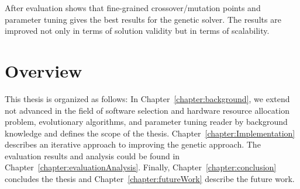 After evaluation shows that fine-grained crossover/mutation points and parameter tuning gives the best results for the genetic solver.
The results are improved not only in terms of solution validity but in terms of scalability.


\section{Overview}
This thesis is organized as follows: In Chapter~\ref{chapter:background}, we extend not advanced in the field of software selection and hardware resource allocation problem, evolutionary algorithms, and parameter tuning reader by background knowledge and defines the scope of the thesis. Chapter~\ref{chapter:Implementation} describes an iterative approach to improving the genetic approach. The evaluation results and analysis could be found in Chapter~\ref{chapter:evaluationAnalysis}. Finally, Chapter~\ref{chapter:conclusion} concludes the thesis and Chapter~\ref{chapter:futureWork} describe the future work.
